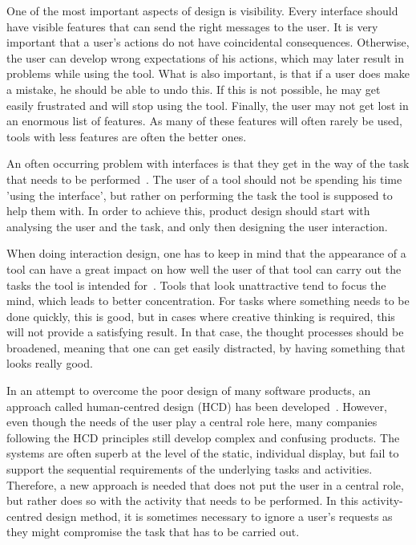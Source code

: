 One of the most important aspects of design is visibility. Every interface should have visible features that can send the right messages to the user. It is very important that a user's actions do not have coincidental consequences. Otherwise, the user can develop wrong expectations of his actions, which may later result in problems while using the tool. What is also important, is that if a user does make a mistake, he should be able to undo this. If this is not possible, he may get easily frustrated and will stop using the tool. Finally, the user may not get lost in an enormous list of features. As many of these features will often rarely be used, tools with less features are often the better ones.

An often occurring problem with interfaces is that they get in the way of the task that needs to be performed~\cite{norman1990interfaces}. The user of a tool should not be spending his time 'using the interface', but rather on performing the task the tool is supposed to help them with. In order to achieve this, product design should start with analysing the user and the task, and only then designing the user interaction.

When doing interaction design, one has to keep in mind that the appearance of a tool can have a great impact on how well the user of that tool can carry out the tasks the tool is intended for~\cite{norman2002emotion}. Tools that look unattractive tend to focus the mind, which leads to better concentration. For tasks where something needs to be done quickly, this is good, but in cases where creative thinking is required, this will not provide a satisfying result. In that case, the thought processes should be broadened, meaning that one can get easily distracted, by having something that looks really good.

In an attempt to overcome the poor design of many software products, an approach called human-centred design (HCD) has been developed~\cite{norman2005human}. However, even though the needs of the user play a central role here, many companies following the HCD principles still develop complex and confusing products. The systems are often superb at the level of the static, individual display, but fail to support the sequential requirements of the underlying tasks and activities. Therefore, a new approach is needed that does not put the user in a central role, but rather does so with the activity that needs to be performed. In this activity-centred design method, it is sometimes necessary to ignore a user's requests as they might compromise the task that has to be carried out.

